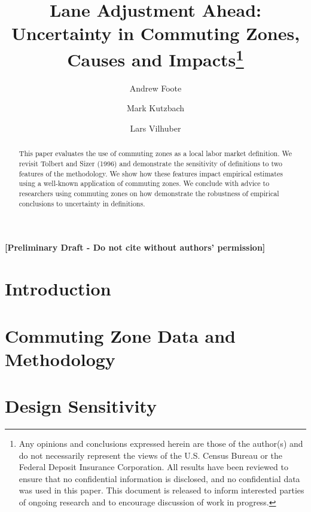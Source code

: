 \documentclass[12pt]{article}
\begin{document}
\title{Lane Adjustment Ahead: Uncertainty in Commuting Zones, Causes and Impacts\thanks{Any opinions and conclusions expressed herein are those of the author(s) and do not necessarily represent the views of the U.S. Census Bureau or the Federal Deposit Insurance Corporation. All results have been reviewed to ensure that no confidential information is disclosed, and no confidential data was used in this paper. This document is released to inform interested parties of ongoing research and to encourage discussion of work in progress.}}
\author[1]{Andrew Foote}
\author[2]{Mark Kutzbach}
\author[1,3]{Lars Vilhuber}
\maketitle


\textbf{[Preliminary Draft - Do not cite without authors' permission]}


\begin{abstract}

This paper evaluates the use of commuting zones as a local labor market definition. We revisit Tolbert and Sizer (1996) and demonstrate the sensitivity of definitions to two features of the methodology. We show how these features impact empirical estimates using a well-known application of commuting zones. We conclude with advice to researchers using commuting zones on how demonstrate the robustness of empirical conclusions to uncertainty in definitions.
\end{abstract}


\doublespacing

\section{Introduction \label{sec:intro}}


\section{Commuting Zone Data and Methodology \label{sec:method}}


\section{Design Sensitivity \label{sec:dsens}}

\end{document}
